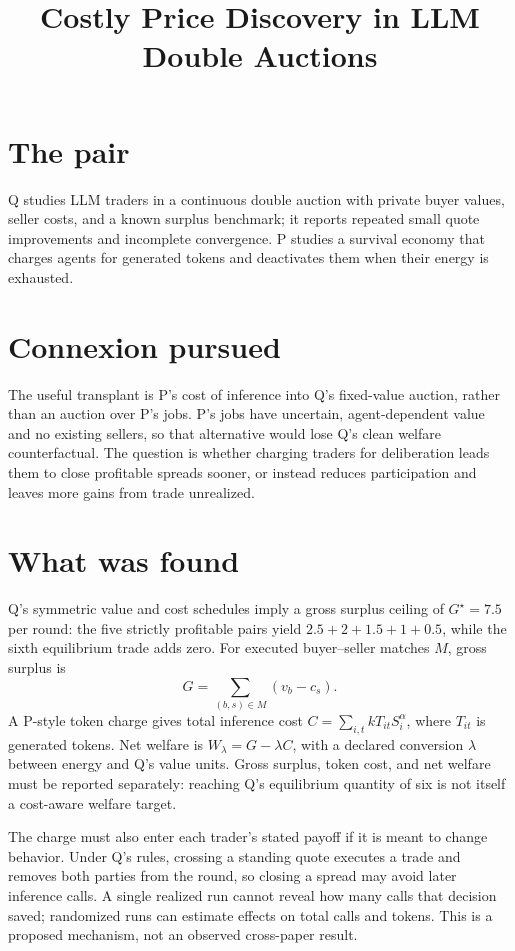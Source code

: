 \documentclass{article}
\title{Costly Price Discovery in LLM Double Auctions}
\begin{document}
\maketitle

\section*{The pair}
Q studies LLM traders in a continuous double auction with private buyer values, seller costs, and a known surplus benchmark; it reports repeated small quote improvements and incomplete convergence. P studies a survival economy that charges agents for generated tokens and deactivates them when their energy is exhausted. 

\section*{Connexion pursued}
The useful transplant is P's cost of inference into Q's fixed-value auction, rather than an auction over P's jobs. P's jobs have uncertain, agent-dependent value and no existing sellers, so that alternative would lose Q's clean welfare counterfactual. The question is whether charging traders for deliberation leads them to close profitable spreads sooner, or instead reduces participation and leaves more gains from trade unrealized. 

\section*{What was found}
Q's symmetric value and cost schedules imply a gross surplus ceiling of \(G^\star=7.5\) per round: the five strictly profitable pairs yield \(2.5+2+1.5+1+0.5\), while the sixth equilibrium trade adds zero. For executed buyer--seller matches \(M\), gross surplus is
\[
G=\sum_{(b,s)\in M}(v_b-c_s).
\]
A P-style token charge gives total inference cost \(C=\sum_{i,t}kT_{it}S_i^\alpha\), where \(T_{it}\) is generated tokens. Net welfare is \(W_\lambda=G-\lambda C\), with a declared conversion \(\lambda\) between energy and Q's value units. Gross surplus, token cost, and net welfare must be reported separately: reaching Q's equilibrium quantity of six is not itself a cost-aware welfare target. 

The charge must also enter each trader's stated payoff if it is meant to change behavior. Under Q's rules, crossing a standing quote executes a trade and removes both parties from the round, so closing a spread may avoid later inference calls. A single realized run cannot reveal how many calls that decision saved; randomized runs can estimate effects on total calls and tokens. This is a proposed mechanism, not an observed cross-paper result. 
\end{document}
